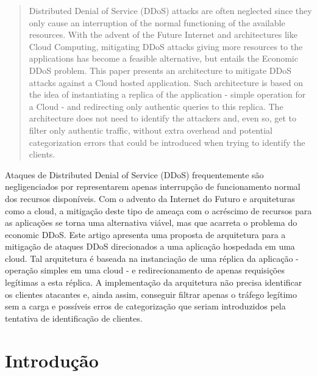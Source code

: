 \documentclass[a4paper, 12pt]{article}
\begin{document}
{\footnotesize

\begin{abstract}
Distributed Denial of Service (DDoS) attacks are often neglected since they only cause an interruption of the normal functioning of the available resources. 
With the advent of the Future Internet and architectures like Cloud Computing, mitigating DDoS attacks giving more resources to the applications has become a feasible alternative, but entails the Economic DDoS problem. This paper presents an architecture to mitigate DDoS attacks against a Cloud hosted application. Such architecture is based on the idea of instantiating a replica of the application - simple operation for a Cloud - and redirecting only authentic queries to this replica. The architecture does not need to identify the attackers and, even so, get to filter only authentic traffic, without extra overhead and potential categorization errors that could be introduced when trying to identify the clients.
%
\end{abstract}

\begin{resumo}
Ataques de Distributed Denial of Service (DDoS) frequentemente são negligenciados por representarem apenas interrupção de funcionamento normal dos recursos disponíveis. 
Com o advento da Internet do Futuro e arquiteturas como a cloud, a mitigação deste tipo de ameaça com o acréscimo de recursos para as aplicações se torna uma alternativa viável, mas que acarreta o problema do economic DDoS. Este artigo apresenta uma proposta de arquitetura para a mitigação de ataques DDoS direcionados a uma aplicação hospedada em uma cloud. Tal arquitetura é baseada na instanciação de uma réplica da aplicação - operação simples em uma cloud - e redirecionamento de apenas requisições legítimas a esta réplica. A implementação da arquitetura não precisa identificar os clientes atacantes e, ainda assim, conseguir filtrar apenas o tráfego legítimo sem a carga e possíveis erros de categorização que seriam introduzidos pela tentativa de identificação de clientes.
% 
\end{resumo}

}

\section{Introdução}

\end{document}
